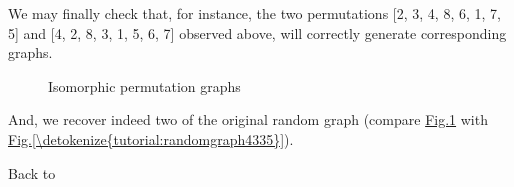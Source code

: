 \documentclass[a4paper,12pt,english]{sphinxhowto}
\let\sphinxpxdimen\pdfpxdimen\else\newdimen\sphinxpxdimen
\begin{document}
We may finally check that, for instance, the two permutations {[}2, 3, 4, 8, 6, 1, 7, 5{]} and {[}4, 2, 8, 3, 1, 5, 6, 7{]} observed above, will correctly generate corresponding  graphs.

\begin{sphinxVerbatim}[commandchars=\\\{\},numbers=left,firstnumber=1,stepnumber=1]
  \PYG{p}{[}       \PYG{p}{]}
  \PYG{p}{[}       \PYG{p}{]}
\end{sphinxVerbatim}

\begin{figure}[H]
\centering
\capstart

\noindent\sphinxincludegraphics[width=700\sphinxpxdimen]{{isomorphicPerms}.png}
\caption{Isomorphic permutation graphs}\label{\detokenize{tutorial:isomorphicpermgraphs}}\end{figure}

And, we recover indeed two  of the original random graph (compare \hyperref[\detokenize{tutorial:isomorphicpermgraphs}]{Fig.\@ \ref{\detokenize{tutorial:isomorphicpermgraphs}}} with \hyperref[\detokenize{tutorial:randomgraph4335}]{Fig.\@ \ref{\detokenize{tutorial:randomgraph4335}}}).

Back to {\hyperref[\detokenize{tutorial:tutorial-label}]{}}
\end{document}
